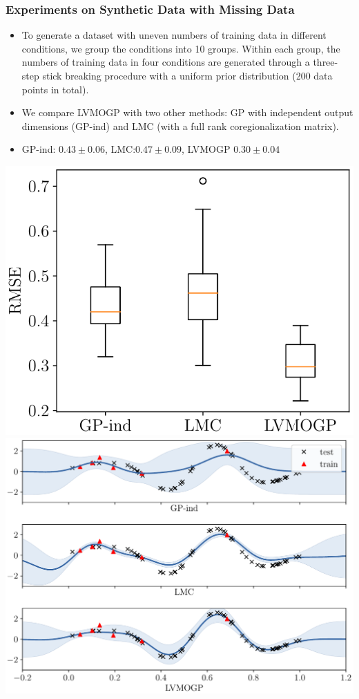 \documentclass[aspectratio=169]{beamer}
\begin{document}
      \begin{frame}
    \frametitle{Experiments on Synthetic Data with Missing Data}
    \begin{itemize}
    \item To generate a dataset with uneven numbers of training data in different conditions, we group the conditions into 10 groups. Within each group, the numbers of training data in four conditions are generated through a three-step stick breaking procedure with a uniform prior distribution (200 data points in total).
    \item We compare LVMOGP with two other methods: GP with independent output dimensions (GP-ind) and LMC (with a full rank coregionalization matrix).
    \item GP-ind: $0.43\pm0.06$, LMC:$0.47\pm0.09$, LVMOGP $0.30\pm0.04$
  \end{itemize}
      \begin{center}
        \includegraphics[width=.3\linewidth]{syn_md_results}
        \includegraphics[width=.32\linewidth]{syn_md_example}
     \end{center}
  \end{frame}
  
\end{document}
